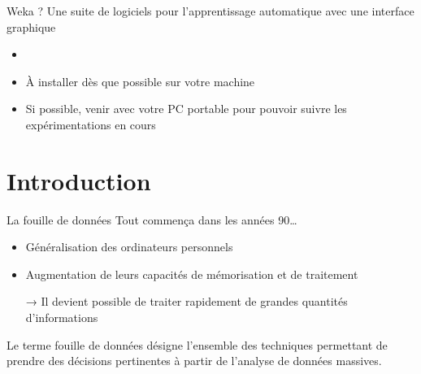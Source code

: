 \documentclass[hyperref={unicode}, xcolor={svgnames}]{beamer}
\begin{document}
\begin{frame}{Weka ?}
    Une suite de logiciels pour l'apprentissage automatique avec une interface graphique
    \begin{itemize}
        \item {}
        \item À installer dès que possible sur votre machine
        \item Si possible, venir avec votre PC portable pour pouvoir suivre les expérimentations en cours
    \end{itemize}
\end{frame}



\section*{Introduction}

\begin{frame}{La fouille de données}
    Tout commença dans les années 90…
    \begin{itemize}
        \item Généralisation des ordinateurs personnels
        \item Augmentation de leurs capacités de mémorisation et de traitement
        \item[→] Il devient possible de traiter rapidement de grandes quantités d'informations
    \end{itemize}
    Le terme \alert{fouille de données} désigne l'ensemble des techniques permettant de prendre des décisions pertinentes à partir de l'analyse de données massives.
\end{frame}
\end{document}
